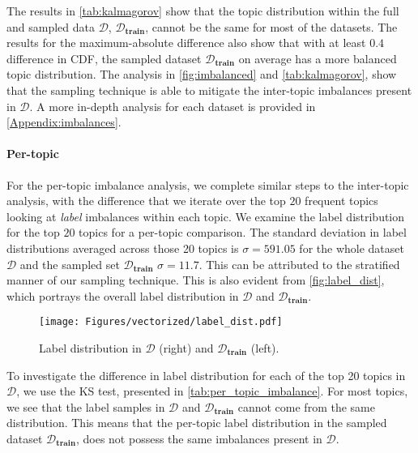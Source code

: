 \documentclass[11pt]{article}
\begin{document}
The results in \autoref{tab:kalmagorov} show that the topic distribution within the full and sampled data $\mathcal{D}$, $\mathcal{D}_\textbf{train}$, cannot be the same for most of the datasets. The results for the maximum-absolute difference also show that with at least $0.4$ difference in CDF, the sampled dataset $\mathcal{D}_\textbf{train}$ on average has a more balanced topic distribution. The analysis in \autoref{fig:imbalanced} and \autoref{tab:kalmagorov}, show that the sampling technique is able to mitigate the inter-topic imbalances present in $\mathcal{D}$. A more in-depth analysis for each dataset is provided in \autoref{Appendix:imbalances}.

\paragraph{Per-topic}

For the per-topic imbalance analysis, we complete similar steps to the inter-topic analysis, with the difference that we iterate over the top $20$ frequent topics looking at \emph{label} imbalances within each topic. We examine the label distribution for the top $20$ topics for a per-topic comparison. The standard deviation in label distributions averaged across those 20 topics is $\sigma=591.05$ for the whole dataset $\mathcal{D}$ and the sampled set $\mathcal{D}_\textbf{train}$ $\sigma=11.7$. This can be attributed to the stratified manner of our sampling technique. This is also evident from \autoref{fig:label_dist}, which portrays the overall label distribution in $\mathcal{D}$ and $\mathcal{D}_\textbf{train}$. 

\begin{figure}
\centering
\texttt{[image: Figures/vectorized/label\_dist.pdf]}
\caption{Label distribution in $\mathcal{D}$ (right) and $\mathcal{D}_\textbf{train}$ (left).}
\label{fig:label_dist}
\end{figure}

To investigate the difference in label distribution for each of the top 20 topics in $\mathcal{D}$, we use the KS test, presented in \autoref{tab:per_topic_imbalance}. For most topics, we see that the label samples in $\mathcal{D}$ and $\mathcal{D}_\textbf{train}$ cannot come from the same distribution. This means that the per-topic label distribution in the sampled dataset $\mathcal{D}_\textbf{train}$, does not possess the same imbalances present in $\mathcal{D}$.
\end{document}
